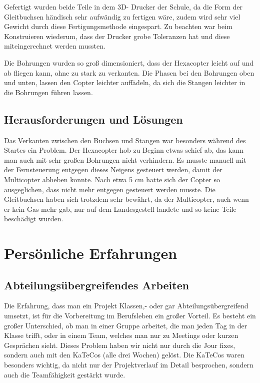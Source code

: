 	Gefertigt wurden beide Teile in dem 3D- Drucker der Schule, da die Form der Gleitbuchsen händisch sehr aufwändig zu fertigen wäre, zudem wird sehr viel Gewicht durch diese Fertigungsmethode eingespart.
	Zu beachten war beim Konstruieren wiederum, dass der Drucker grobe Toleranzen hat und diese miteingerechnet werden mussten.

	Die Bohrungen wurden so groß dimensioniert, dass der Hexacopter leicht auf und ab fliegen kann, ohne zu stark zu verkanten.
	Die Phasen bei den Bohrungen oben und unten, lassen den Copter leichter auffädeln, da sich die Stangen leichter in die Bohrungen führen lassen.

	\subsection{Herausforderungen und Lösungen}

	Das Verkanten zwischen den Buchsen und Stangen war besonders während des Startes ein Problem.
	Der Hexacopter hob zu Beginn etwas  schief ab, das kann man auch mit sehr großen Bohrungen nicht verhindern.
	Es musste manuell mit der Fernsteuerung entgegen dieses Neigens gesteuert werden, damit der Multicopter abheben konnte.
	Nach etwa 5 cm hatte sich der Copter so ausgeglichen, dass nicht mehr entgegen gesteuert werden musste.
	Die Gleitbuchsen haben sich trotzdem sehr bewährt, da der Multicopter, auch wenn er kein Gas mehr gab, nur auf dem Landesgestell landete und so keine Teile beschädigt wurden.

			\newpage

\section{Persönliche Erfahrungen}

	\subsection{Abteilungsübergreifendes Arbeiten}

	Die Erfahrung, dass man ein Projekt Klassen,- oder gar Abteilungsübergreifend umsetzt, ist für die Vorbereitung im Berufsleben ein großer Vorteil.
	Es besteht ein großer Unterschied, ob man in einer Gruppe arbeitet, die man jeden Tag in der Klasse trifft, oder in einem Team, welches man nur zu Meetings oder kurzen Gesprächen sieht.
	Dieses Problem haben wir nicht nur durch die Jour fixes, sondern auch mit den KaTeCos (alle drei Wochen) gelöst.
	Die KaTeCos waren besonders wichtig, da nicht nur der Projektverlauf im Detail besprochen, sondern auch die Teamfähigkeit gestärkt wurde.

